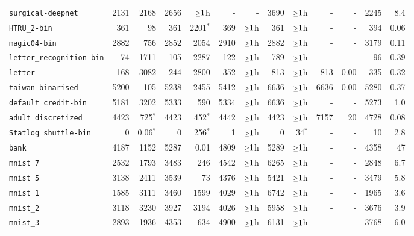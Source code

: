 \begin{tabular}{lrrrrrrrrrrrr}
\texttt{surgical-deepnet} & 2131 & 2168 & 2656 & $\mathsmaller{\geq}1$h & - & - & 3690 & $\mathsmaller{\geq}1$h & - & - & 2245 & 8.4\\
\texttt{HTRU\_2-bin} & 361 & 98 & 361 & 2201$^*$ & 369 & $\mathsmaller{\geq}1$h & 361 & $\mathsmaller{\geq}1$h & - & - & 394 & 0.06\\
\texttt{magic04-bin} & 2882 & 756 & 2852 & 2054 & 2910 & $\mathsmaller{\geq}1$h & 2882 & $\mathsmaller{\geq}1$h & - & - & 3179 & 0.11\\
\texttt{letter\_recognition-bin} & 74 & 1711 & 105 & 2287 & 122 & $\mathsmaller{\geq}1$h & 789 & $\mathsmaller{\geq}1$h & - & - & 96 & 0.39\\
\texttt{letter} & 168 & 3082 & 244 & 2800 & 352 & $\mathsmaller{\geq}1$h & 813 & $\mathsmaller{\geq}1$h & 813 & 0.00 & 335 & 0.32\\
\texttt{taiwan\_binarised} & 5200 & 105 & 5238 & 2455 & 5412 & $\mathsmaller{\geq}1$h & 6636 & $\mathsmaller{\geq}1$h & 6636 & 0.00 & 5280 & 0.37\\
\texttt{default\_credit-bin} & 5181 & 3202 & 5333 & 590 & 5334 & $\mathsmaller{\geq}1$h & 6636 & $\mathsmaller{\geq}1$h & - & - & 5273 & 1.0\\
\texttt{adult\_discretized} & 4423 & 725$^*$ & 4423 & 452$^*$ & 4442 & $\mathsmaller{\geq}1$h & 4423 & $\mathsmaller{\geq}1$h & 7157 & 20 & 4728 & 0.08\\
\texttt{Statlog\_shuttle-bin} & 0 & 0.06$^*$ & 0 & 256$^*$ & 1 & $\mathsmaller{\geq}1$h & 0 & 34$^*$ & - & - & 10 & 2.8\\
\texttt{bank} & 4187 & 1152 & 5287 & 0.01 & 4809 & $\mathsmaller{\geq}1$h & 5289 & $\mathsmaller{\geq}1$h & - & - & 4358 & 47\\
\texttt{mnist\_7} & 2532 & 1793 & 3483 & 246 & 4542 & $\mathsmaller{\geq}1$h & 6265 & $\mathsmaller{\geq}1$h & - & - & 2848 & 6.7\\
\texttt{mnist\_5} & 3138 & 2411 & 3539 & 73 & 4376 & $\mathsmaller{\geq}1$h & 5421 & $\mathsmaller{\geq}1$h & - & - & 3479 & 5.8\\
\texttt{mnist\_1} & 1585 & 3111 & 3460 & 1599 & 4029 & $\mathsmaller{\geq}1$h & 6742 & $\mathsmaller{\geq}1$h & - & - & 1965 & 3.6\\
\texttt{mnist\_2} & 3118 & 3230 & 3927 & 3194 & 4026 & $\mathsmaller{\geq}1$h & 5958 & $\mathsmaller{\geq}1$h & - & - & 3676 & 3.9\\
\texttt{mnist\_3} & 2893 & 1936 & 4353 & 634 & 4900 & $\mathsmaller{\geq}1$h & 6131 & $\mathsmaller{\geq}1$h & - & - & 3768 & 6.0\\

\end{tabular}
